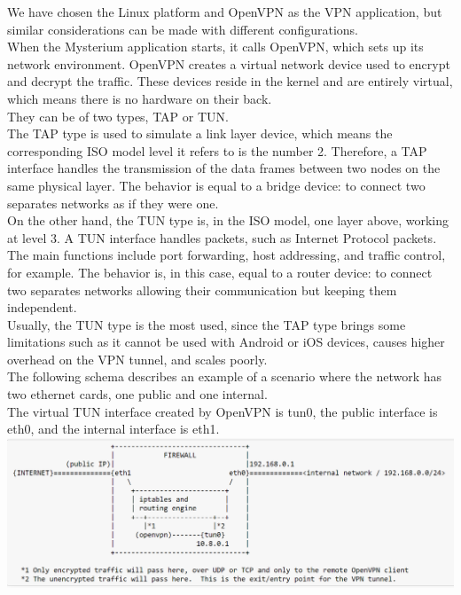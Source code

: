 \documentclass[]{article}
\begin{document}
	We have chosen the Linux platform and OpenVPN as the VPN application, but similar considerations can be made with different configurations.\\
	When the Mysterium application starts, it calls OpenVPN, which sets up its network environment. OpenVPN creates a virtual network device used to encrypt and decrypt the traffic. These devices reside in the kernel and are entirely virtual, which means there is no hardware on their back.\\They can be of two types, TAP or TUN.\\
	The TAP type is used to simulate a link layer device, which means the corresponding ISO model level it refers to is the number 2. Therefore, a TAP interface handles the transmission of the data frames between two nodes on the same physical layer. The behavior is equal to a bridge device: to connect two separates networks as if they were one.\\
	On the other hand, the TUN type is, in the ISO model, one layer above, working at level 3. A TUN interface handles packets, such as Internet Protocol packets. The main functions include port forwarding, host addressing, and traffic control, for example. The behavior is, in this case, equal to a router device: to connect two separates networks allowing their communication but keeping them independent.\\
	Usually, the TUN type is the most used, since the TAP type brings some limitations such as it cannot be used with Android or iOS devices, causes higher overhead on the VPN tunnel, and scales poorly.\\
	The following schema describes an example of a scenario where the network has two ethernet cards, one public and one internal.\\
	The virtual TUN interface created by OpenVPN is tun0, the public interface is eth0, and the internal interface is eth1.\\

	\includegraphics[width=1\textwidth]{"images/openvpn_routing_setup.PNG"}
\end{document}
